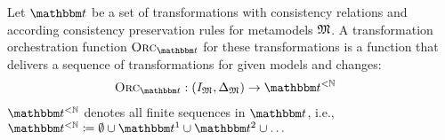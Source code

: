 \begin{definition} \label{def:orchestrationfunction}
    Let $\transformationset{T}$ be a set of transformations with consistency relations and according consistency preservation rules for metamodels $\metamodeltuple{M}$.
    A transformation orchestration function $\orcfunction{\transformationset{T}}$ for these transformations is a function that delivers a sequence of transformations for given models and changes:
    \begin{align*}
        &
        \orcfunction{\transformationset{T}} : (\metamodeltupleinstanceset{M}, \changeuniverse{\metamodeltuple{M}}) \rightarrow \transformationset{T}^{< \mathbb{N}}
    \end{align*}
    $\transformationset{T}^{< \mathbb{N}}$ denotes all finite sequences in $\transformationset{T}$, i.e., $\transformationset{T}^{< \mathbb{N}} \equalsperdefinition \emptyset \cup \transformationset{T}^1 \cup \transformationset{T}^2 \cup \dots$
\end{definition}


